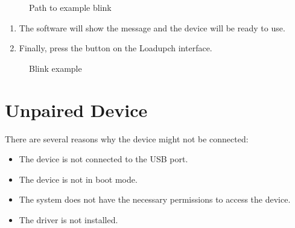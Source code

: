 \documentclass[letterpaper,10pt,english]{sphinxmanual}
\begin{document}
\begin{figure}[htbp]
\centering
\capstart

\noindent{}
\caption{Path to example blink}\label{\detokenize{examples:id3}}\label{\detokenize{examples:figure-example}}\end{figure}
\begin{enumerate}
%
\setcounter{enumi}{5}
\item {} 
\sphinxAtStartPar
The software will show the message  and the device will be ready to use.

\item {} 
\sphinxAtStartPar
Finally, press the  button on the Loadupch interface.

\end{enumerate}

\begin{figure}[htbp]
\centering
\capstart

\noindent{}
\caption{Blink example}\label{\detokenize{examples:id4}}\label{\detokenize{examples:figure-flash-firmware}}\end{figure}

\sphinxstepscope


\chapter{Unpaired Device}
\label{\detokenize{error:unpaired-device}}\label{\detokenize{error::doc}}
\sphinxAtStartPar
There are several reasons why the device might not be connected:
\begin{itemize}
\item {} 
\sphinxAtStartPar
The device is not connected to the USB port.

\item {} 
\sphinxAtStartPar
The device is not in boot mode.

\item {} 
\sphinxAtStartPar
The system does not have the necessary permissions to access the device.

\item {} 
\sphinxAtStartPar
The driver is not installed.

\end{itemize}
\end{document}
